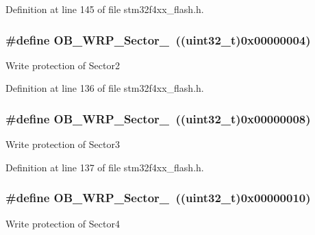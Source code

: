 Definition at line 145 of file stm32f4xx\-\_\-flash.\-h.

\hypertarget{group___option___bytes___write___protection_ga7753cebe1a52745ff90147970f7ec32e}{
\subsubsection[{O\-B\-\_\-\-W\-R\-P\-\_\-\-Sector\-\_\-2}]{\setlength{\rightskip}{0pt plus 5cm}\#define O\-B\-\_\-\-W\-R\-P\-\_\-\-Sector\-\_~((uint32\-\_\-t)0x00000004)}}\label{group___option___bytes___write___protection_ga7753cebe1a52745ff90147970f7ec32e}
Write protection of Sector2 

Definition at line 136 of file stm32f4xx\-\_\-flash.\-h.

\hypertarget{group___option___bytes___write___protection_ga0c5703b7294cccd7a1db08075032c863}{
\subsubsection[{O\-B\-\_\-\-W\-R\-P\-\_\-\-Sector\-\_\-3}]{\setlength{\rightskip}{0pt plus 5cm}\#define O\-B\-\_\-\-W\-R\-P\-\_\-\-Sector\-\_~((uint32\-\_\-t)0x00000008)}}\label{group___option___bytes___write___protection_ga0c5703b7294cccd7a1db08075032c863}
Write protection of Sector3 

Definition at line 137 of file stm32f4xx\-\_\-flash.\-h.

\hypertarget{group___option___bytes___write___protection_gabb50050de92ef1fb2d0d0927323d8206}{
\subsubsection[{O\-B\-\_\-\-W\-R\-P\-\_\-\-Sector\-\_\-4}]{\setlength{\rightskip}{0pt plus 5cm}\#define O\-B\-\_\-\-W\-R\-P\-\_\-\-Sector\-\_~((uint32\-\_\-t)0x00000010)}}\label{group___option___bytes___write___protection_gabb50050de92ef1fb2d0d0927323d8206}
Write protection of Sector4 

